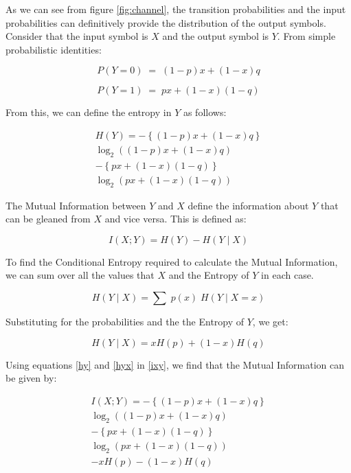 As we can see from figure \ref{fig:channel}, the transition probabilities and the input probabilities can definitively provide the distribution of the output symbols. Consider that the input symbol is $X$ and the output symbol is $Y$. From simple probabilistic identities:

\begin{equation}
    P(Y=0) \; = \; (1-p)x + (1-x)q
\end{equation}

\begin{equation}
    P(Y=1) \; = \; px + (1-x)(1-q)
\end{equation}

From this, we can define the entropy in $Y$ as follows:

\begin{multline}
\label{hy}
    H(Y) = -\left\{(1-p)x+(1-x)q\right\}\\\log_2{\left((1-p)x+(1-x)q\right)}\\-\left\{px+(1-x)(1-q)\right\}\\\log_2{\left(px+(1-x)(1-q)\right)}
\end{multline}

The Mutual Information between $Y$ and $X$ define the information about $Y$ that can be gleaned from $X$ and vice versa. This is defined as:

\begin{equation}
\label{ixy}
    I(X;Y) = H(Y) - H(Y\mid X)
\end{equation}

To find the Conditional Entropy required to calculate the Mutual Information, we can sum over all the values that $X$ and the Entropy of $Y$ in each case.

\begin{equation}
    H(Y\mid X) = \sum \;p(x)\;H(Y\mid X = x)
\end{equation}

Substituting for the probabilities and the the Entropy of $Y$, we get:

\begin{equation}
\label{hyx}
    H(Y\mid X) = xH(p) + (1-x)H(q)    
\end{equation}

Using equations \ref{hy} and \ref{hyx} in \ref{ixy}, we find that the Mutual Information can be given by:

\begin{multline}
    I(X;Y) = -\left\{(1-p)x+(1-x)q\right\}\\\log_2{\left((1-p)x+(1-x)q\right)}\\-\left\{px+(1-x)(1-q)\right\}\\\log_2{\left(px+(1-x)(1-q)\right)} \\ - xH(p) - (1-x)H(q)
\end{multline}

